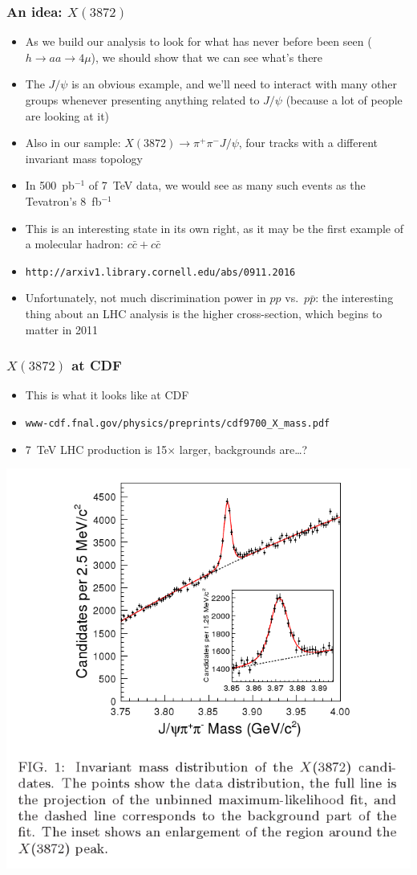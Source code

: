 \documentclass[compress]{beamer}
\begin{document}
\begin{frame}
\frametitle{An idea: $X(3872)$}

\begin{itemize}
\item As we build our analysis to look for what has never before been seen ($h \to aa \to 4\mu$), we should show that we can see what's there
\item The $J/\psi$ is an obvious example, and we'll need to interact with many other groups whenever presenting anything related to $J/\psi$ (because a lot of people are looking at it)
\item Also in our sample: $X(3872) \to \pi^+\pi^- J/\psi$, four tracks with a different invariant mass topology
\item In 500~pb$^{-1}$ of 7~TeV data, we would see as many such events as the Tevatron's 8~fb$^{-1}$
\item This is an interesting state in its own right, as it may be the first example of a molecular hadron: $c\bar{c} + c\bar{c}$
\item {\tt http://arxiv1.library.cornell.edu/abs/0911.2016}
\item Unfortunately, not much discrimination power in $pp$ vs.\ $p\bar{p}$: the interesting thing about an LHC analysis is the higher cross-section, which begins to matter in 2011
\end{itemize}
\end{frame}

\begin{frame}
\frametitle{$X(3872)$ at CDF}

\begin{itemize}
\item This is what it looks like at CDF
\item {\tt www-cdf.fnal.gov/physics/preprints/cdf9700\_X\_mass.pdf}
\item 7~TeV LHC production is 15$\times$ larger, backgrounds are\ldots?
\end{itemize}

\includegraphics[width=0.5\linewidth]{cdf_x_plot.png}

\label{numpages}
\end{frame}
\end{document}
